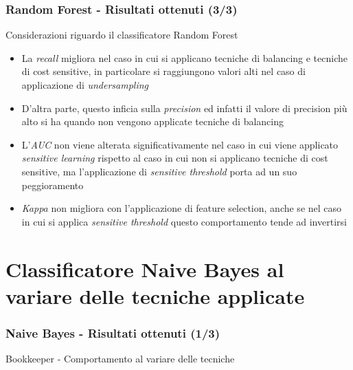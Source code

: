 \documentclass[
	usepdftitle=false,
	xcolor={table, dvipsnames},
	hyperref={
		pdftitle={Machine Learning per Software Engineering},
    	pdfauthor={Alessando Chillotti}
    }
]{beamer}
\begin{document}
\begin{frame}
\frametitle{Random Forest - Risultati ottenuti (3/3)}
\begin{block}{Considerazioni riguardo il classificatore Random Forest}
\begin{itemize}
\item La \textit{recall} migliora nel caso in cui si applicano tecniche di balancing e tecniche di cost sensitive, in particolare si raggiungono valori alti nel caso di applicazione di \textit{undersampling}
\item D'altra parte, questo inficia sulla \textit{precision} ed infatti il valore di precision più alto si ha quando non vengono applicate tecniche di balancing
\item L'\textit{AUC} non viene alterata significativamente nel caso in cui viene applicato \textit{sensitive learning} rispetto al caso in cui non si applicano tecniche di cost sensitive, ma l'applicazione di \textit{sensitive threshold} porta ad un suo peggioramento
\item \textit{Kappa} non migliora con l'applicazione di feature selection, anche se nel caso in cui si applica \textit{sensitive threshold} questo comportamento tende ad invertirsi
\end{itemize}
\end{block}
\end{frame}

\section{Classificatore Naive Bayes al variare delle tecniche applicate}
\begin{frame}
\frametitle{Naive Bayes - Risultati ottenuti (1/3)}
\begin{block}{Bookkeeper - Comportamento al variare delle tecniche}
\begin{figure}[ht!]
\end{figure}
\end{block}
\end{frame}
\end{document}
